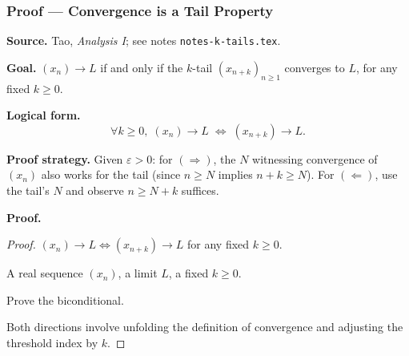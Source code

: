 
\clearpage
{}
\hypertarget{proof-RA-TAO-P-tail-property}{}

\subsubsection[Convergence is a Tail Property]{Proof --- Convergence is a Tail Property}

\bigskip

\noindent
\textbf{Source.}
Tao, \emph{Analysis I}; see notes \texttt{notes-k-tails.tex}.

\vspace{0.75em}

\noindent
\textbf{Goal.}
$(x_n) \to L$ if and only if the $k$-tail $(x_{n+k})_{n \ge 1}$ converges
to $L$, for any fixed $k \ge 0$.

\vspace{0.75em}

\noindent
\textbf{Logical form.}
\[
  \forall k \ge 0,\;
  (x_n) \to L
  \;\iff\;
  (x_{n+k}) \to L.
\]

\vspace{0.75em}

\noindent
\textbf{Proof strategy.}
Given $\varepsilon > 0$: for $(\Rightarrow)$, the $N$ witnessing convergence
of $(x_n)$ also works for the tail (since $n \ge N$ implies $n + k \ge N$).
For $(\Leftarrow)$, use the tail's $N$ and observe $n \ge N + k$ suffices.

\vspace{0.75em}

\noindent
\textbf{Proof.}
\begin{proof}
\Claim $(x_n) \to L \iff (x_{n+k}) \to L$ for any fixed $k \ge 0$.

\Given A real sequence $(x_n)$, a limit $L$, a fixed $k \ge 0$.

\Goal Prove the biconditional.

\Strategy Both directions involve unfolding the definition of convergence
and adjusting the threshold index by $k$.

\medskip



\end{proof}

